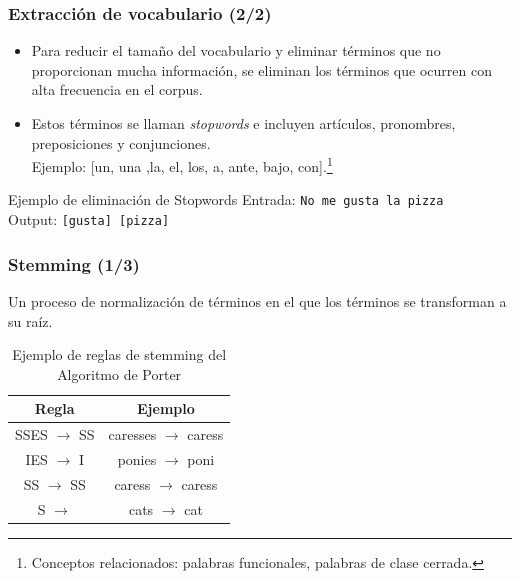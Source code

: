 \documentclass[handout]{beamer}
\begin{document}
\begin{frame}\frametitle{Extracción de vocabulario (2/2)}
\begin{itemize}
 \item Para reducir el tamaño del vocabulario y eliminar términos que no proporcionan mucha información, se eliminan los términos que ocurren con alta frecuencia en el corpus.
 \item Estos términos se llaman \emph{stopwords} e incluyen artículos, pronombres, preposiciones y conjunciones.
  \\
Ejemplo: [un, una ,la, el, los, a, ante, bajo, con].\footnote{Conceptos relacionados: palabras funcionales, palabras de clase cerrada.}
\end{itemize}

\begin{block}{Ejemplo de eliminación de Stopwords}
    \centering
    \vspace{0.5em}
    Entrada: 
    \texttt{No me gusta la pizza}\\
    \vspace{0.5em}
    Output: 
    \texttt{[gusta] [pizza]}\\
    \vspace{0.5em}
\end{block}

\end{frame}


\begin{frame}\frametitle{Stemming (1/3)}
Un proceso de normalización de términos en el que los términos se transforman a su raíz.\\ 

\begin{table}[h!]
\centering
\begin{tabular}{c|c}
\hline
\textbf{Regla} & \textbf{Ejemplo} \\
\hline
SSES $\rightarrow$ SS & caresses $\rightarrow$ caress \\
IES $\rightarrow$ I & ponies $\rightarrow$ poni \\
SS $\rightarrow$ SS & caress $\rightarrow$ caress \\
S $\rightarrow$ & cats $\rightarrow$ cat \\
\hline
\end{tabular}
\caption{Ejemplo de reglas de stemming del Algoritmo de Porter}
\vspace{-0.5cm}
\end{table}
\end{frame}
\end{document}
